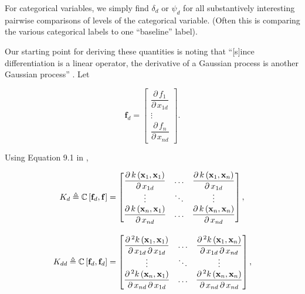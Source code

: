 \documentclass{draft}
\newcommand{\pd}{\ensuremath{\partial \,}}     %
\newcommand{\gradient}{\ensuremath{\mathbf{f}_d}} %
\begin{document}
\noindent
For categorical variables, we simply find \( \delta_d \) or \( \psi_d \) for all substantively interesting pairwise comparisons of
levels of the categorical variable.
(Often this is comparing the various categorical labels to one ``baseline'' label).

Our starting point for deriving these quantities is noting that
``[s]ince differentiation is a linear operator, the derivative of a Gaussian process is another Gaussian process''
\citep[191]{RasmussenWilliams2006Gaussian}.
Let

\begin{equation}
    \gradient = 
    \begin{bmatrix}
        \dfrac{\pd f_1}{\pd x_{1d}} \\
        \vdots \\
        \dfrac{\pd f_n}{\pd x_{nd}}
    \end{bmatrix}.
\end{equation}

Using Equation 9.1 in \citet{RasmussenWilliams2006Gaussian},

\vspace*{-\baselineskip}
\begin{align}
    K_d \triangleq
    \C \left[ \gradient, \mathbf{f} \right]
    & = 
    \begin{bmatrix}
        \dfrac{\pd k \left(\mathbf{x}_1, \mathbf{x}_1 \right)}{\pd x_{1d}} & \ldots & \dfrac{\pd k \left(\mathbf{x}_1, \mathbf{x}_n \right)}{\pd x_{1d}} \\
        \vdots                                                       & \ddots & \vdots \\
        \dfrac{\pd k \left(\mathbf{x}_n, \mathbf{x}_1 \right)}{\pd x_{nd}} & \ldots & \dfrac{\pd k \left(\mathbf{x}_n, \mathbf{x}_n \right)}{\pd x_{nd}}
    \end{bmatrix}, \\[1em]
    K_{dd} \triangleq
    \C \left[ \gradient, \gradient \right]
    & = 
    \begin{bmatrix}
        \dfrac{\pd^2 k \left(\mathbf{x}_1, \mathbf{x}_1 \right)}{\pd x_{1d} \, \pd x_{1d}} & \ldots & \dfrac{\pd^2 k \left(\mathbf{x}_1, \mathbf{x}_n \right)}{\pd x_{1d} \, \pd x_{nd}} \\
        \vdots                                                       & \ddots & \vdots \\
        \dfrac{\pd^2 k \left(\mathbf{x}_n, \mathbf{x}_1 \right)}{\pd x_{nd} \, \pd x_{1d}} & \ldots & \dfrac{\pd^2 k \left(\mathbf{x}_n, \mathbf{x}_n \right)}{\pd x_{nd} \, \pd x_{nd}}
    \end{bmatrix},
\end{align}
\end{document}
